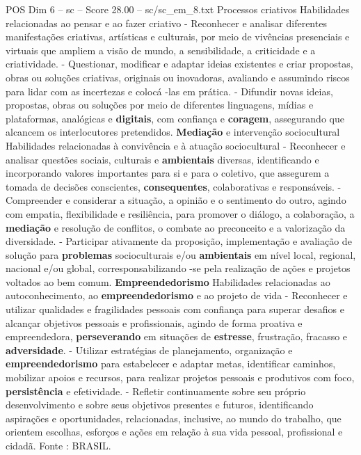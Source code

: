 \begin{textsample}{POS Dim 6 – sc – Score 28.00 – sc/sc\_em\_8.txt}
Processos criativos Habilidades relacionadas ao pensar e ao fazer criativo - Reconhecer e analisar diferentes manifestações criativas, artísticas e culturais, por meio de vivências presenciais e virtuais que ampliem a visão de mundo, a sensibilidade, a criticidade e a criatividade. - Questionar, modificar e adaptar ideias existentes e criar propostas, obras ou soluções criativas, originais ou inovadoras, avaliando e assumindo riscos para lidar com as incertezas e colocá -las em prática. - Difundir novas ideias, propostas, obras ou soluções por meio de diferentes linguagens, mídias e plataformas, analógicas e \textbf{digitais}, com confiança e \textbf{coragem}, assegurando que alcancem os interlocutores pretendidos. \textbf{Mediação} e intervenção sociocultural Habilidades relacionadas à convivência e à atuação sociocultural - Reconhecer e analisar questões sociais, culturais e \textbf{ambientais} diversas, identificando e incorporando valores importantes para si e para o coletivo, que assegurem a tomada de decisões conscientes, \textbf{consequentes}, colaborativas e responsáveis. - Compreender e considerar a situação, a opinião e o sentimento do outro, agindo com empatia, flexibilidade e resiliência, para promover o diálogo, a colaboração, a \textbf{mediação} e resolução de conflitos, o combate ao preconceito e a valorização da diversidade. - Participar ativamente da proposição, implementação e avaliação de solução para \textbf{problemas} socioculturais e/ou \textbf{ambientais} em nível local, regional, nacional e/ou global, corresponsabilizando -se pela realização de ações e projetos voltados ao bem comum. \textbf{Empreendedorismo} Habilidades relacionadas ao autoconhecimento, ao \textbf{empreendedorismo} e ao projeto de vida - Reconhecer e utilizar qualidades e fragilidades pessoais com confiança para superar desafios e alcançar objetivos pessoais e profissionais, agindo de forma proativa e empreendedora, \textbf{perseverando} em situações de \textbf{estresse}, frustração, fracasso e \textbf{adversidade}. - Utilizar estratégias de planejamento, organização e \textbf{empreendedorismo} para estabelecer e adaptar metas, identificar caminhos, mobilizar apoios e recursos, para realizar projetos pessoais e produtivos com foco, \textbf{persistência} e efetividade. - Refletir continuamente sobre seu próprio desenvolvimento e sobre seus objetivos presentes e futuros, identificando aspirações e oportunidades, relacionadas, inclusive, ao mundo do trabalho, que orientem escolhas, esforços e ações em relação à sua vida pessoal, profissional e cidadã.
Fonte : BRASIL.

\end{textsample}
